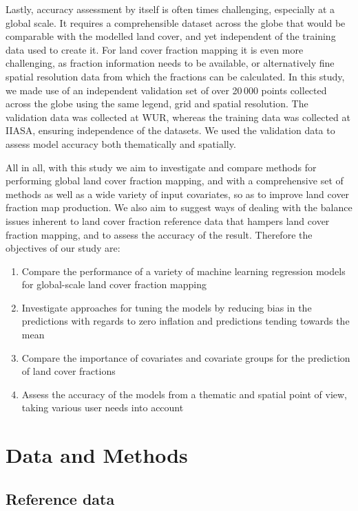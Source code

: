 \documentclass[review,authoryear,3p]{elsarticle}
\begin{document}
Lastly, accuracy assessment by itself is often times challenging, especially at a global scale.
It requires a comprehensible dataset across the globe that would be comparable with the modelled land cover, and yet independent of the training data used to create it.
For land cover fraction mapping it is even more challenging, as fraction information needs to be available, or alternatively fine spatial resolution data from which the fractions can be calculated.
In this study, we made use of an independent validation set of over 20\,000 points collected across the globe using the same legend, grid and spatial resolution.
The validation data was collected at \gls{WUR}, whereas the training data was collected at \gls{IIASA}, ensuring independence of the datasets.
We used the validation data to assess model accuracy both thematically and spatially.

All in all, with this study we aim to investigate and compare methods for performing global land cover fraction mapping, and with a comprehensive set of methods as well as a wide variety of input covariates, so as to improve land cover fraction map production.
We also aim to suggest ways of dealing with the balance issues inherent to land cover fraction reference data that hampers land cover fraction mapping, and to assess the accuracy of the result.
Therefore the objectives of our study are:

\begin{enumerate}
 \item Compare the performance of a variety of machine learning regression models for global-scale land cover fraction mapping
 \item Investigate approaches for tuning the models by reducing bias in the predictions with regards to zero inflation and predictions tending towards the mean
 \item Compare the importance of covariates and covariate groups for the prediction of land cover fractions
 \item Assess the accuracy of the models from a thematic and spatial point of view, taking various user needs into account
\end{enumerate}


\section{Data and Methods}

\subsection{Reference data}
\end{document}
